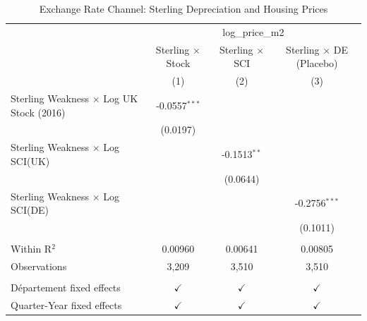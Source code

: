 
\begin{table}[htbp]
   \caption{\label{tab:exchange} Exchange Rate Channel: Sterling Depreciation and Housing Prices}
   \bigskip
   \centering
   \begin{tabular}{lccc}
      \toprule
       & \multicolumn{3}{c}{log\_price\_m2}\\
                                                      & Sterling $\times$ Stock  & Sterling $\times$ SCI  & Sterling $\times$ DE (Placebo) \\    
                                                      & (1)                      & (2)                    & (3)\\  
      \midrule 
      Sterling Weakness $\times$ Log UK Stock (2016)  & -0.0557$^{***}$          &                        &   \\   
                                                      & (0.0197)                 &                        &   \\   
      Sterling Weakness $\times$ Log SCI(UK)          &                          & -0.1513$^{**}$         &   \\   
                                                      &                          & (0.0644)               &   \\   
      Sterling Weakness $\times$ Log SCI(DE)          &                          &                        & -0.2756$^{***}$\\   
                                                      &                          &                        & (0.1011)\\   
       \\
      Within R$^2$                                    & 0.00960                  & 0.00641                & 0.00805\\  
      Observations                                    & 3,209                    & 3,510                  & 3,510\\  
       \\
      D\'epartement fixed effects                     & $\checkmark$             & $\checkmark$           & $\checkmark$\\   
      Quarter-Year fixed effects                      & $\checkmark$             & $\checkmark$           & $\checkmark$\\   
      \bottomrule
   \end{tabular}
\end{table}


